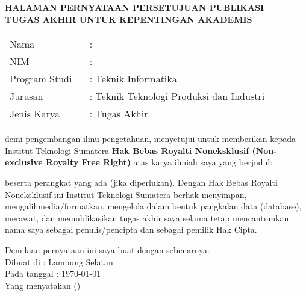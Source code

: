 \clearpage
{}%

\begin{center}
	\smallskip
	
	\normalsize \bfseries \MakeUppercase{
		HALAMAN PERNYATAAN PERSETUJUAN PUBLIKASI \\
		TUGAS AKHIR UNTUK KEPENTINGAN AKADEMIS
	}\linebreak
	
	\normalsize \normalfont \onehalfspacing {}
	
	\flushleft
	\setlength{\tabcolsep}{0pt}
	\begin{tabular}{l l}
		Nama 			&  : \theauthor\\
		NIM 			&  : \printnim\\
		Program Studi \	&  : Teknik Informatika\\
		Jurusan 		&  : Teknik Teknologi Produksi dan Industri\\
		Jenis Karya 	&  : Tugas Akhir\\
	\end{tabular}

	\justifying
	demi pengembangan ilmu pengetahuan, menyetujui untuk memberikan kepada Institut Teknologi Sumatera \textbf{Hak Bebas Royalti Noneksklusif (Non-exclusive Royalty Free Right)} atas karya ilmiah saya yang berjudul: 
	
	\centering
	\textbf{\thetitle}
	
	\justifying
	beserta perangkat yang ada (jika diperlukan). Dengan Hak Bebas Royalti Noneksklusif ini Institut Teknologi Sumatera berhak menyimpan, mengalihmedia/formatkan, mengelola dalam bentuk pangkalan data (database), merawat, dan memublikasikan tugas akhir saya selama tetap mencantumkan nama saya sebagai penulis/pencipta dan sebagai pemilik Hak Cipta.
	
	Demikian pernyataan ini saya buat dengan sebenarnya. \\
	
	\centering
	Dibuat di : Lampung Selatan\\
	Pada tanggal : \today{}\\ %
	\vspace{3cm}
	Yang menyatakan (\theauthor)
	
	
\end{center}
\clearpage
